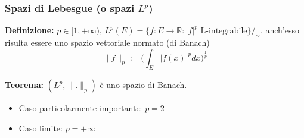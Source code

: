 \documentclass[a4paper]{article}
\newcommand{\R}{\mathbb{R}}
\begin{document}
\subsubsection{Spazi di Lebesgue (o spazi $L^p$)}
\begin{tcolorbox}
	\textbf{Definizione:} $p\in[1,+\infty)$, $L^p(E)=\{f:E\to \R:|f|^p\text{ L-integrabile}\}/_{\sim}$, anch'esso risulta essere uno spazio vettoriale normato (di Banach)
	\[\|f\|_p:=\bigg(\int_{E}^{} |f(x)|^pdx\bigg)^{\frac{1}{p}}\] 
\end{tcolorbox}
\begin{tcolorbox}
	\textbf{Teorema:} $(L^p,\|.\|_p)$ è uno spazio di Banach.
\end{tcolorbox}
\begin{itemize}
	\item Caso particolarmente importante: $p=2$
	\item Caso limite: $p=+\infty$
\end{itemize}
\end{document}
